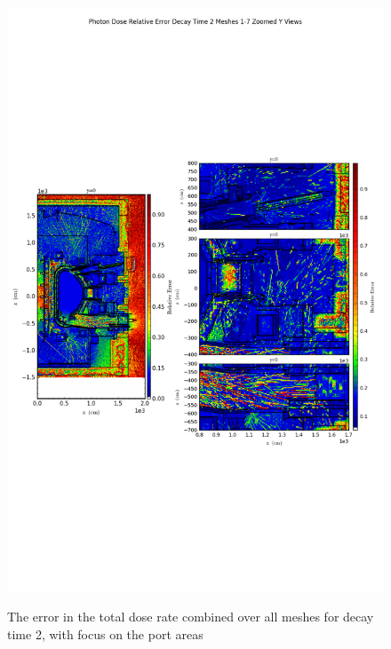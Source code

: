 \documentclass[12pt]{article}
\begin{document}
\begin{figure}[ht!]
\centering
\includegraphics[trim={0cm 9cm 0cm 10cm},clip,scale=0.75]{../plots/final_model/Photon_Dose_Relative_Error_Decay_Time_2_Meshes_1-7_Zoomed_Y_Views.png}
\label{fig:photons_dc2_b4c_total_error_zoomed}
\caption{The error in the total dose rate combined over all meshes for decay time 2, with focus on the port areas}
\end{figure}
\clearpage
\end{document}
